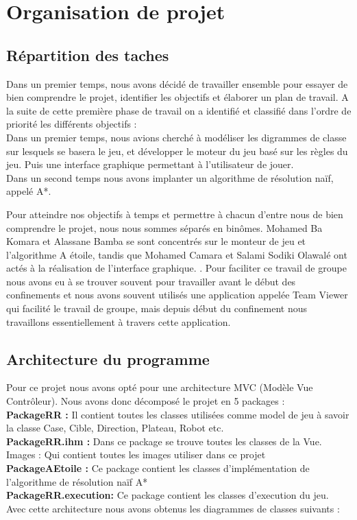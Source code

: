 \documentclass[12pt]{article}
\begin{document}
		\section{Organisation de projet }
			\subsection{Répartition des taches }
			
			
			Dans un premier temps, nous avons décidé de travailler ensemble pour essayer de bien comprendre le projet, identifier les objectifs et élaborer un plan de travail.
			A la suite de cette première phase de travail on a identifié et classifié dans l’ordre de priorité les différents objectifs :
			\\Dans un premier temps, nous avions cherché à modéliser les digrammes de classe sur lesquels se basera le jeu, et développer le moteur du jeu basé sur les règles du jeu. Puis une interface graphique permettant à l’utilisateur de jouer.   
			\\Dans un second temps nous avons implanter un algorithme de résolution naïf, appelé A*.
			
			Pour atteindre nos objectifs à temps et permettre à chacun d’entre nous de bien comprendre le projet, nous nous sommes séparés en binômes. Mohamed Ba Komara et Alassane Bamba se sont concentrés sur le monteur de jeu et l’algorithme A étoile, tandis que Mohamed Camara et Salami Sodiki Olawalé ont actés à la réalisation de l’interface graphique. . Pour faciliter ce travail de groupe nous avons eu à se trouver souvent pour travailler avant le début des confinements et nous avons souvent utilisés une application appelée Team Viewer qui facilité le travail de groupe, mais depuis début du confinement nous travaillons essentiellement à travers cette application. 
			
			
			\subsection{Architecture du programme }
			
				
			Pour ce projet nous avons opté pour une architecture MVC (Modèle Vue Contrôleur). Nous avons donc décomposé le projet en 5 packages :
			\\\textbf{PackageRR :} Il contient toutes les classes utilisées comme model de jeu à savoir la classe Case, Cible, Direction, Plateau, Robot etc.
			\\\textbf{PackageRR.ihm : } Dans ce package se trouve toutes les classes de la Vue.
			Images : Qui contient toutes les images utiliser dans ce projet 
			\\\textbf{PackageAEtoile : } Ce package contient les classes d’implémentation de l’algorithme de résolution naïf A*
			\\\textbf{PackageRR.execution:}  Ce package contient les classes d'execution du jeu.
			\\Avec cette architecture nous avons obtenus les diagrammes de classes suivants :
			
\end{document}
